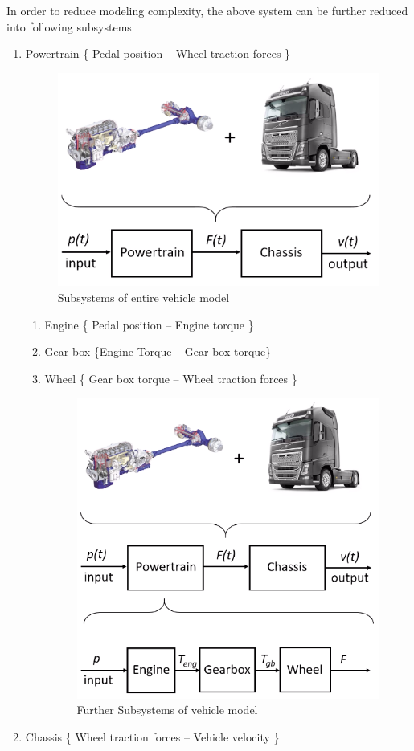 In order to reduce modeling complexity, the above system can be further reduced into following subsystems
\begin{enumerate}
	\item Powertrain \{ Pedal position -- Wheel traction forces \}
	\begin{figure}[h!]
		\centering
		\includegraphics[width=0.5\linewidth]{Bilder/ModelAutoSystems_Subs2}
		\caption{Subsystems of entire vehicle model}
	\end{figure}
	\begin{enumerate}
		\item Engine \{ Pedal position -- Engine torque \}
		\item Gear box \{Engine Torque -- Gear box torque\}
		\item Wheel \{ Gear box torque -- Wheel traction forces \}
		\begin{figure}[h!]
			\centering
			\includegraphics[width=0.5\linewidth]{Bilder/ModelAutoSystems_Subs3}
			\caption{Further Subsystems of vehicle model}
		\end{figure}
	\end{enumerate}
	\item Chassis \{ Wheel traction forces -- Vehicle velocity \}
\end{enumerate}
\newpage

